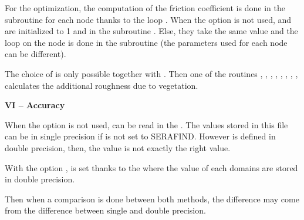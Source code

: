 For the optimization, the computation of the friction coefficient is done
in the  subroutine for each node thanks to the loop
.
When the option  is not used,  and
 are initialized to 1 and  in the subroutine
.
Else, they take the same value and the loop on the node is done in the
 subroutine (the parameters used for each node can be
different).

The choice of  is only possible together with
 . Then one of the  routines 
, , , 
, , 
, 
, ,
calculates the additional roughness due to vegetation. 

\textbf{VI -- Accuracy}

When the option  is not used,  can be read
in the .
The values stored in this file can be in single precision if 
 is not set to SERAFIND.
However  is defined in double precision, then,
the  value is not exactly the right value.

With the option ,  is set
thanks to the  where the value of each domains
are stored in double precision.

Then when a comparison is done between both methods, the difference may come
from the difference between single and double precision.
